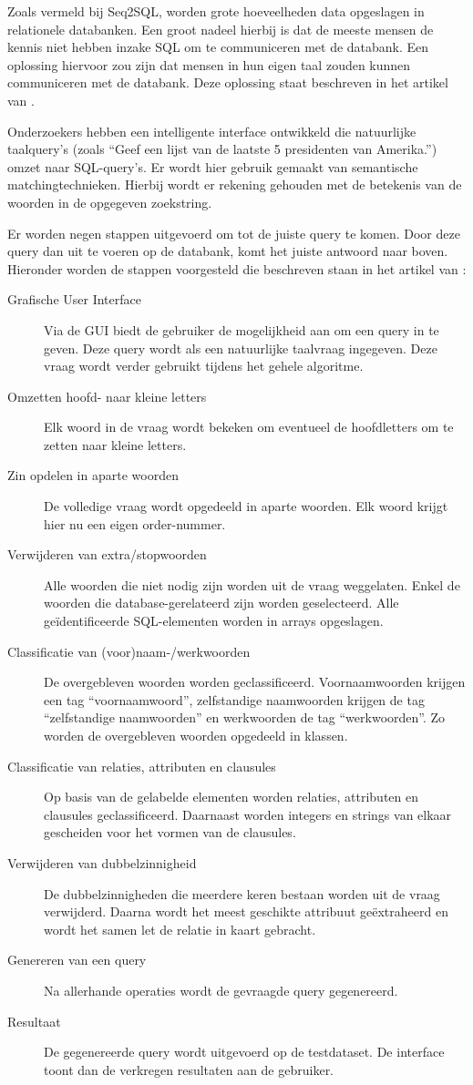 Zoals vermeld bij Seq2SQL, worden grote hoeveelheden data opgeslagen in relationele databanken. Een groot nadeel hierbij is dat de meeste mensen de kennis niet hebben inzake SQL om te communiceren met de databank. Een oplossing hiervoor zou zijn dat mensen in hun eigen taal zouden kunnen communiceren met de databank. Deze oplossing staat beschreven in het artikel van \textcite{nlidbs}.

Onderzoekers hebben een intelligente interface ontwikkeld die natuurlijke taalquery’s (zoals “Geef een lijst van de laatste 5 presidenten van Amerika.”) omzet naar SQL-query’s. Er wordt hier gebruik gemaakt van semantische matchingtechnieken. Hierbij wordt er rekening gehouden met de betekenis van de woorden in de opgegeven zoekstring. 

Er worden negen stappen uitgevoerd om tot de juiste query te komen. Door deze query dan uit te voeren op de databank, komt het juiste antwoord naar boven. Hieronder worden de stappen voorgesteld die beschreven staan in het artikel van \textcite{nlidbs}:

\begin{description}
	\item[Grafische User Interface] Via de GUI biedt de gebruiker de mogelijkheid aan om een query in te geven. Deze query wordt als een natuurlijke taalvraag ingegeven. Deze vraag wordt verder gebruikt tijdens het gehele algoritme.
	\item[Omzetten hoofd- naar kleine letters] Elk woord in de vraag wordt bekeken om eventueel de hoofdletters om te zetten naar kleine letters.
	\item[Zin opdelen in aparte woorden] De volledige vraag wordt opgedeeld in aparte woorden. Elk woord krijgt hier nu een eigen order-nummer.
	\item[Verwijderen van extra/stopwoorden] Alle woorden die niet nodig zijn worden uit de vraag weggelaten. Enkel de woorden die database-gerelateerd zijn worden geselecteerd. Alle geïdentificeerde SQL-elementen worden in arrays opgeslagen.
	\item[Classificatie van (voor)naam-/werkwoorden] De overgebleven woorden worden geclassificeerd. Voornaamwoorden krijgen een tag “voornaamwoord”, zelfstandige naamwoorden krijgen de tag “zelfstandige naamwoorden” en werkwoorden de tag “werkwoorden”. Zo worden de overgebleven woorden opgedeeld in klassen.
	\item[Classificatie van relaties, attributen en clausules] Op basis van de gelabelde elementen worden relaties, attributen en clausules geclassificeerd. Daarnaast worden integers en strings van elkaar gescheiden voor het vormen van de clausules.
	\item[Verwijderen van dubbelzinnigheid] De dubbelzinnigheden die meerdere keren bestaan worden uit de vraag verwijderd. Daarna wordt het meest geschikte attribuut geëxtraheerd en wordt het samen let de relatie in kaart gebracht.
	\item[Genereren van een query] Na allerhande operaties wordt de gevraagde query gegenereerd.
	\item[Resultaat] De gegenereerde query wordt uitgevoerd op de testdataset. De interface toont dan de verkregen resultaten aan de gebruiker.
\end{description}

